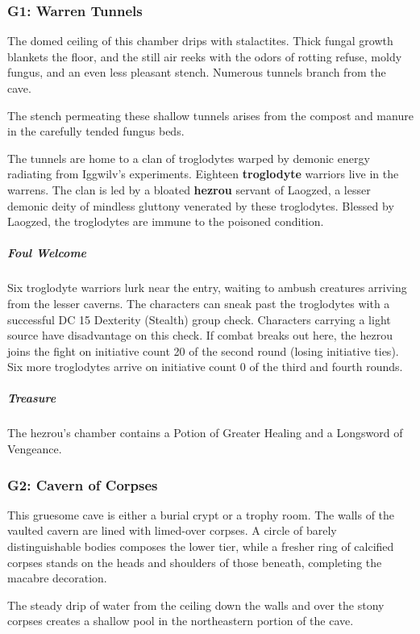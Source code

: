 \documentclass[10pt,a4paper,twoside,bg=print,twocolumn,openany,nodeprecatedcode]{dndbook}
\begin{document}
\subsubsection{G1: Warren Tunnels}
\begin{DndReadAloud}{}
The domed ceiling of this chamber drips with stalactites. Thick fungal growth blankets the floor, and the still air reeks with the odors of rotting refuse, moldy fungus, and an even less pleasant stench. Numerous tunnels branch from the cave.

\end{DndReadAloud}

The stench permeating these shallow tunnels arises from the compost and manure in the carefully tended fungus beds.

The tunnels are home to a clan of troglodytes warped by demonic energy radiating from Iggwilv's experiments. Eighteen \textbf{troglodyte} warriors live in the warrens. The clan is led by a bloated \textbf{hezrou} servant of Laogzed, a lesser demonic deity of mindless gluttony venerated by these troglodytes. Blessed by Laogzed, the troglodytes are immune to the poisoned condition.

\subparagraph{Foul Welcome}
Six troglodyte warriors lurk near the entry, waiting to ambush creatures arriving from the lesser caverns. The characters can sneak past the troglodytes with a successful DC 15 Dexterity (Stealth) group check. Characters carrying a light source have disadvantage on this check. If combat breaks out here, the hezrou joins the fight on initiative count 20 of the second round (losing initiative ties). Six more troglodytes arrive on initiative count 0 of the third and fourth rounds.

\subparagraph{Treasure}
The hezrou's chamber contains a Potion of Greater Healing and a Longsword of Vengeance.

\subsubsection{G2: Cavern of Corpses}
\begin{DndReadAloud}{}
This gruesome cave is either a burial crypt or a trophy room. The walls of the vaulted cavern are lined with limed-over corpses. A circle of barely distinguishable bodies composes the lower tier, while a fresher ring of calcified corpses stands on the heads and shoulders of those beneath, completing the macabre decoration.

The steady drip of water from the ceiling down the walls and over the stony corpses creates a shallow pool in the northeastern portion of the cave.

\end{DndReadAloud}
\end{document}
